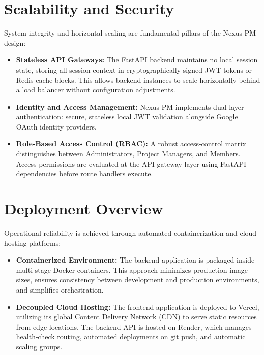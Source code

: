 \section{Scalability and Security}
System integrity and horizontal scaling are fundamental pillars of the Nexus PM design:
\begin{itemize}
    \item \textbf{Stateless API Gateways:} The FastAPI backend maintains no local session state, storing all session context in cryptographically signed JWT tokens or Redis cache blocks. This allows backend instances to scale horizontally behind a load balancer without configuration adjustments.
    \item \textbf{Identity and Access Management:} Nexus PM implements dual-layer authentication: secure, stateless local JWT validation alongside Google OAuth identity providers.
    \item \textbf{Role-Based Access Control (RBAC):} A robust access-control matrix distinguishes between Administrators, Project Managers, and Members. Access permissions are evaluated at the API gateway layer using FastAPI dependencies before route handlers execute.
\end{itemize}

\section{Deployment Overview}
Operational reliability is achieved through automated containerization and cloud hosting platforms:
\begin{itemize}
    \item \textbf{Containerized Environment:} The backend application is packaged inside multi-stage Docker containers. This approach minimizes production image sizes, ensures consistency between development and production environments, and simplifies orchestration.
    \item \textbf{Decoupled Cloud Hosting:} The frontend application is deployed to Vercel, utilizing its global Content Delivery Network (CDN) to serve static resources from edge locations. The backend API is hosted on Render, which manages health-check routing, automated deployments on git push, and automatic scaling groups.
\end{itemize}

